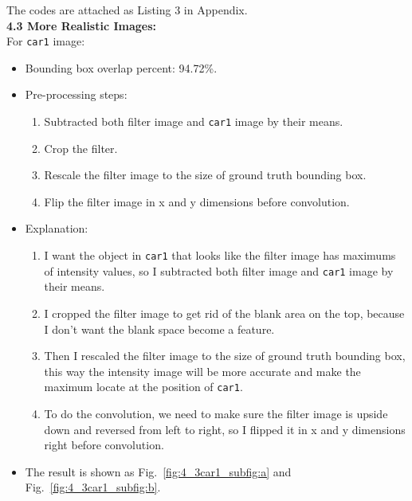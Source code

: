 \documentclass{assignment}
\begin{document}
\begin{problemlist}
The codes are attached as Listing 3 in Appendix.\\

\newpage
\textbf{4.3 More Realistic Images:}\\
For \texttt{car1} image:
\begin{itemize}
    \item Bounding box overlap percent: 94.72\%.
    \item Pre-processing steps: 
    \begin{enumerate}[label={\alph*)}]
        \item Subtracted both filter image and \texttt{car1} image by their means.
        \item Crop the filter.
        \item Rescale the filter image to the size of ground truth bounding box.
        \item Flip the filter image in x and y dimensions before convolution.
    \end{enumerate}
    \item Explanation: 
    \begin{enumerate}[label={\alph*)}]
        \item I want the object in \texttt{car1} that looks like the filter image has maximums of intensity values, so I subtracted both filter image and \texttt{car1} image by their means.
        \item I cropped the filter image to get rid of the blank area on the top, because I don't want the blank space become a feature.
        \item Then I rescaled the filter image to the size of ground truth bounding box, this way the intensity image will be more accurate and make the maximum locate at the position of \texttt{car1}.
        \item To do the convolution, we need to make sure the filter image is upside down and reversed from left to right, so I flipped it in x and y dimensions right before convolution.
    \end{enumerate}
    \item The result is shown as Fig.~\ref{fig:4_3car1_subfig:a} and Fig.~\ref{fig:4_3car1_subfig:b}.
\end{itemize}


\end{problemlist}
\end{document}
